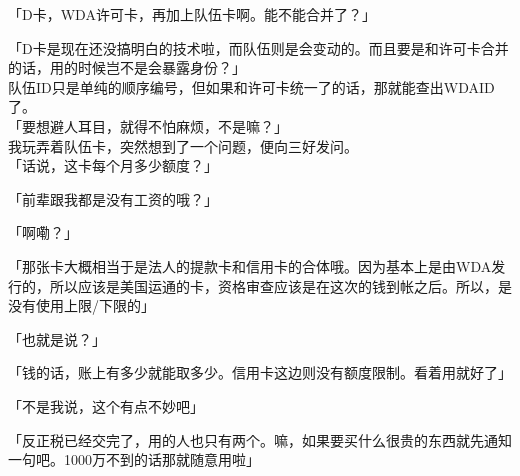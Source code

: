 「D卡，WDA许可卡，再加上队伍卡啊。能不能合并了？」

「D卡是现在还没搞明白的技术啦，而队伍则是会变动的。而且要是和许可卡合并的话，用的时候岂不是会暴露身份？」\\

队伍ID只是单纯的顺序编号，但如果和许可卡统一了的话，那就能查出WDAID了。\\

「要想避人耳目，就得不怕麻烦，不是嘛？」\\

我玩弄着队伍卡，突然想到了一个问题，便向三好发问。\\

「话说，这卡每个月多少额度？」

「前辈跟我都是没有工资的哦？」

「啊嘞？」

「那张卡大概相当于是法人的提款卡和信用卡的合体哦。因为基本上是由WDA发行的，所以应该是美国运通的卡，资格审查应该是在这次的钱到帐之后。所以，是没有使用上限/下限的」

「也就是说？」

「钱的话，账上有多少就能取多少。信用卡这边则没有额度限制。看着用就好了」

「不是我说，这个有点不妙吧」

「反正税已经交完了，用的人也只有两个。嘛，如果要买什么很贵的东西就先通知一句吧。1000万不到的话那就随意用啦」


